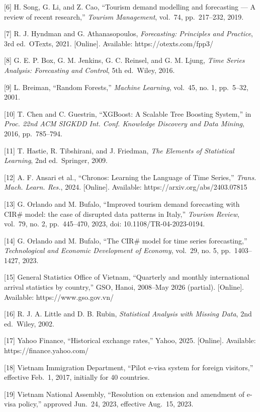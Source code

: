 \documentclass[
]{article}
\begin{document}
{[}6{]} H. Song, G. Li, and Z. Cao, ``Tourism demand modelling and
forecasting --- A review of recent research,'' \emph{Tourism
Management}, vol.~74, pp.~217--232, 2019.

{[}7{]} R. J. Hyndman and G. Athanasopoulos, \emph{Forecasting:
Principles and Practice}, 3rd ed.~OTexts, 2021. {[}Online{]}. Available:
https://otexts.com/fpp3/

{[}8{]} G. E. P. Box, G. M. Jenkins, G. C. Reinsel, and G. M. Ljung,
\emph{Time Series Analysis: Forecasting and Control}, 5th ed.~Wiley,
2016.

{[}9{]} L. Breiman, ``Random Forests,'' \emph{Machine Learning},
vol.~45, no. 1, pp.~5--32, 2001.

{[}10{]} T. Chen and C. Guestrin, ``XGBoost: A Scalable Tree Boosting
System,'' in \emph{Proc. 22nd ACM SIGKDD Int. Conf. Knowledge Discovery
and Data Mining}, 2016, pp.~785--794.

{[}11{]} T. Hastie, R. Tibshirani, and J. Friedman, \emph{The Elements
of Statistical Learning}, 2nd ed.~Springer, 2009.

{[}12{]} A. F. Ansari et al., ``Chronos: Learning the Language of Time
Series,'' \emph{Trans. Mach. Learn. Res.}, 2024. {[}Online{]}.
Available: https://arxiv.org/abs/2403.07815

{[}13{]} G. Orlando and M. Bufalo, ``Improved tourism demand forecasting
with CIR\# model: the case of disrupted data patterns in Italy,''
\emph{Tourism Review}, vol.~79, no. 2, pp.~445--470, 2023, doi:
10.1108/TR-04-2023-0194.

{[}14{]} G. Orlando and M. Bufalo, ``The CIR\# model for time series
forecasting,'' \emph{Technological and Economic Development of Economy},
vol.~29, no. 5, pp.~1403--1427, 2023.

{[}15{]} General Statistics Office of Vietnam, ``Quarterly and monthly
international arrival statistics by country,'' GSO, Hanoi, 2008--May
2026 (partial). {[}Online{]}. Available: https://www.gso.gov.vn/

{[}16{]} R. J. A. Little and D. B. Rubin, \emph{Statistical Analysis
with Missing Data}, 2nd ed.~Wiley, 2002.

{[}17{]} Yahoo Finance, ``Historical exchange rates,'' Yahoo, 2025.
{[}Online{]}. Available: https://finance.yahoo.com/

{[}18{]} Vietnam Immigration Department, ``Pilot e-visa system for
foreign visitors,'' effective Feb.~1, 2017, initially for 40 countries.

{[}19{]} Vietnam National Assembly, ``Resolution on extension and
amendment of e-visa policy,'' approved Jun.~24, 2023, effective Aug.~15,
2023.
\end{document}
